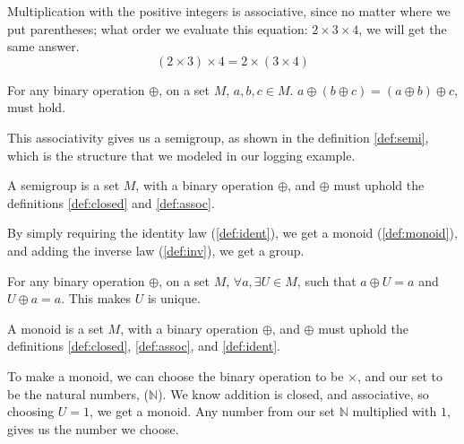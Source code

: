 \begin{exmp} \label{exmp:assoc}
  Multiplication with the positive integers is associative, since no matter
  where we put parentheses; what order we evaluate this equation:
  $2 \times 3 \times 4$, we will get the same answer.
  $$
  (2 \times 3) \times 4 = 2 \times (3 \times 4)
  $$
\end{exmp}

\begin{definition} \label{def:assoc}
  For any binary operation $\oplus$, on a set $M$, $a, b, c \in M$.
  $a \oplus \left ( b \oplus c \right ) = \left ( a \oplus b \right ) \oplus c$,
  must hold.
\end{definition}

This associativity gives us a semigroup, as shown in the definition
\ref{def:semi}, which is the structure that we modeled in our logging example.

\begin{definition}[Semigroup] \label{def:semi}
  A semigroup is a set $M$, with a binary operation $\oplus$, and $\oplus$ must
  uphold the definitions \ref{def:closed} and \ref{def:assoc}.
\end{definition}

By simply requiring the identity law (\ref{def:ident}), we get a
monoid (\ref{def:monoid}), and adding the inverse law
(\ref{def:inv}), we get a group.

\begin{definition} \label{def:ident}
  For any binary operation $\oplus$, on a set $M$, $\forall a, \exists U \in M$,
  such that $a \oplus U = a$ and $U \oplus a = a$. This makes $U$ is unique.
\end{definition}

\begin{definition}[Monoid] \label{def:monoid}
  A monoid is a set $M$, with a binary operation $\oplus$, and $\oplus$ must
  uphold the definitions \ref{def:closed}, \ref{def:assoc}, and \ref{def:ident}.
\end{definition}

\begin{exmp}
  To make a monoid, we can choose the binary operation to be $\times$, and our
  set to be the natural numbers, ($\mathbb{N}$). We know addition is closed, and
  associative, so choosing $U = 1$, we get a monoid. Any number from our set
  $\mathbb{N}$ multiplied with $1$, gives us the number we choose.
\end{exmp}

